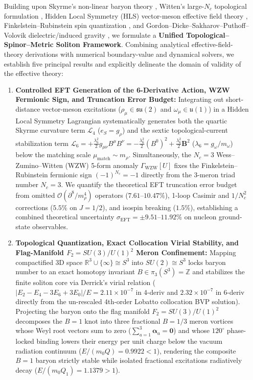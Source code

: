 \documentclass[10pt,aps,prd,twocolumn,superscriptaddress,nofootinbib,floatfix,longbibliography,showkeys]{revtex4-2}
\begin{document}
Building upon Skyrme's non-linear baryon theory \cite{ref1,ref2}, Witten's large-$N_c$ topological formulation \cite{ref3,ref4,ref5}, Hidden Local Symmetry (HLS) vector-meson effective field theory \cite{ref6,ref7,ref8,ref9,ref10}, Finkelstein--Rubinstein spin quantization \cite{ref11}, and Gordon--Dicke--Sakharov--Puthoff--Volovik dielectric/induced gravity \cite{ref12,ref13,ref14,ref15,ref16,ref17}, we formulate a \textbf{Unified Topological--Spinor--Metric Soliton Framework}. Combining analytical effective-field-theory derivations with numerical boundary-value and dynamical solvers, we establish five principal results and explicitly delineate the domain of validity of the effective theory:

\begin{enumerate}
  \item \textbf{Controlled EFT Generation of the 6-Derivative Action, WZW Fermionic Sign, and Truncation Error Budget:} Integrating out short-distance vector-meson excitations ($\rho_\mu \in \mathfrak{su}(2)$ and $\omega_\mu \in \mathfrak{u}(1)$) in a Hidden Local Symmetry Lagrangian systematically generates both the quartic Skyrme curvature term $\mathcal{L}_4$ ($e_S = g_\rho$) and the sextic topological-current stabilization term $\mathcal{L}_6 = +\frac{\lambda_6^2}{2} g_{\mu\nu} B^\mu B^\nu = -\frac{\lambda_6^2}{2}(B^0)^2 + \frac{\lambda_6^2}{2}\mathbf{B}^2$ ($\lambda_6 = g_\omega/m_\omega$) below the matching scale $\mu_{\text{match}} \sim m_\rho$. Simultaneously, the $N_c = 3$ Wess--Zumino--Witten (WZW) 5-form anomaly $\Gamma_{\text{WZW}}[U]$ fixes the Finkelstein--Rubinstein fermionic sign $(-1)^{N_c} = -1$ directly from the 3-meron triad number $N_c = 3$. We quantify the theoretical EFT truncation error budget from omitted $\mathcal{O}(\partial^8/m_\rho^4)$ operators ($7.61\text{--}10.47\%$), 1-loop Casimir and $1/N_c^2$ corrections ($5.5\%$ on $J=1/2$), and isospin breaking ($1.5\%$), establishing a combined theoretical uncertainty $\sigma_{\text{EFT}} = \pm 9.51\text{--}11.92\%$ on nucleon ground-state observables.
  \item \textbf{Topological Quantization, Exact Collocation Virial Stability, and Flag-Manifold $F_2 = SU(3)/U(1)^2$ Meron Confinement:} Mapping compactified 3D space $\mathbb{R}^3 \cup \{\infty\} \cong S^3$ into $SU(2) \cong S^3$ locks baryon number to an exact homotopy invariant $B \in \pi_3(S^3) = \mathbb{Z}$ and stabilizes the finite soliton core via Derrick's virial relation \cite{ref18} ($|E_2 - E_4 - 3E_6 + 3E_0|/E = 2.11 \times 10^{-7}$ in 4-deriv and $2.32 \times 10^{-7}$ in 6-deriv directly from the un-rescaled 4th-order Lobatto collocation BVP solution). Projecting the baryon onto the flag manifold $F_2 = SU(3)/U(1)^2$ decomposes the $B=1$ knot into three fractional $B=1/3$ meron vortices whose Weyl root vectors sum to zero ($\sum_{a=1}^3 \boldsymbol{\alpha}_a = \mathbf{0}$) and whose $120^\circ$ phase-locked binding lowers their energy per unit charge below the vacuum radiation continuum ($E/(m_0 Q) = 0.9922 < 1$), rendering the composite $B=1$ baryon strictly stable while isolated fractional excitations radiatively decay ($E/(m_0 Q_1) = 1.1379 > 1$).

\end{enumerate}
\end{document}
